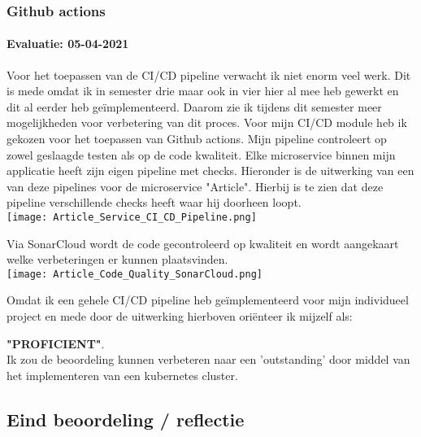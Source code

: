\subsubsection{Github actions}
\paragraph{Evaluatie: 05-04-2021}
Voor het toepassen van de CI/CD pipeline verwacht ik niet enorm veel werk.
Dit is mede omdat ik in semester drie maar ook in vier hier al mee heb gewerkt en dit al eerder heb geïmplementeerd.
Daarom zie ik tijdens dit semester meer mogelijkheden voor verbetering van dit proces.
Voor mijn CI/CD module heb ik gekozen voor het toepassen van Github actions.
Mijn pipeline controleert op zowel geslaagde testen als op de code kwaliteit.
Elke microservice binnen mijn applicatie heeft zijn eigen pipeline met checks.
Hieronder is de uitwerking van een van deze pipelines voor de microservice "Article".
Hierbij is te zien dat deze pipeline verschillende checks heeft waar hij doorheen loopt.\\

\texttt{[image: Article\_Service\_CI\_CD\_Pipeline.png]}\label{fig:figure}


Via SonarCloud wordt de code gecontroleerd op kwaliteit en wordt aangekaart welke verbeteringen er kunnen plaatsvinden.\\

\texttt{[image: Article\_Code\_Quality\_SonarCloud.png]}\label{fig:figure2}


Omdat ik een gehele CI/CD pipeline heb geïmplementeerd voor mijn individueel project en mede door de uitwerking hierboven oriënteer ik mijzelf als:
\par\vspace{10pt}\textbf{\uppercase{"Proficient"}}.\\

Ik zou de beoordeling kunnen verbeteren naar een 'outstanding' door middel van het implementeren van een kubernetes cluster.

\subsection{Eind beoordeling / reflectie}

